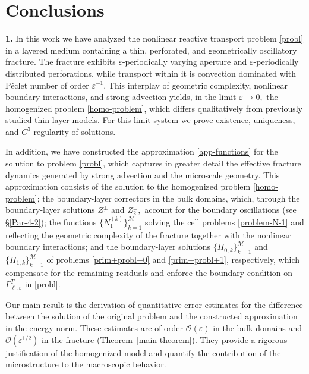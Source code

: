 \documentclass[reqno]{amsart}            %
\numberwithin{equation}{section}
\begin{document}
	\section{Conclusions}\label{Sect-6}
	
\textbf{1.} In this work we have analyzed the nonlinear reactive transport problem \eqref{probl} in a layered medium containing a thin, perforated, and geometrically oscillatory fracture. The fracture exhibits $\varepsilon$-periodically  varying aperture and $\varepsilon$-periodically distributed perforations, while transport within it is convection dominated with Péclet number of order $\varepsilon^{-1}.$ This interplay of geometric complexity, nonlinear boundary interactions, and strong advection yields, in the limit $\varepsilon \rightarrow 0,$ the homogenized problem \eqref{homo-problem}, which differs qualitatively  from previously studied thin-layer models. For this limit system we prove existence, uniqueness, and $C^3$-regularity of solutions.

In addition, we have constructed the approximation \eqref{app-functions} for the solution to problem \eqref{probl}, which captures in greater detail the effective fracture dynamics generated by strong advection and the microscale geometry. 
This approximation consists of the solution to the homogenized problem \eqref{homo-problem}; the boundary-layer correctors in the bulk domains, which, through the boundary-layer solutions $Z_1^{\pm }$ and $Z_2^{\pm },$ account for the boundary oscillations (see \S\ref{Par-4-2}); the functions $\{ N_1^{(k)}\} _{k=1}^{\mathcal{M}}$ solving the cell problems \eqref{problem-N-1} and reflecting the geometric complexity of the fracture together with the nonlinear boundary interactions; and the boundary-layer solutions $\{\Pi _{0,k}\}_{k=1}^{\mathcal{M}}$ and $\{\Pi_{1,k}\}_{k=1}^{\mathcal{M}}$ of problems \eqref{prim+probl+0} and \eqref{prim+probl+1}, respectively, which compensate for the remaining residuals and enforce the boundary condition on $\Gamma _{\ell ,\varepsilon }^T$ in \eqref{probl}.

Our main result is the derivation of quantitative error estimates for the difference between the solution of the original problem and the constructed approximation in the energy norm. These estimates are of order $\mathcal{O}(\varepsilon )$ in the bulk domains and $\mathcal{O}(\varepsilon^{1/2})$ in the fracture (Theorem~\ref{main theorem}). They provide a rigorous justification of the homogenized model and quantify the contribution of the microstructure to the macroscopic behavior.
\end{document}
